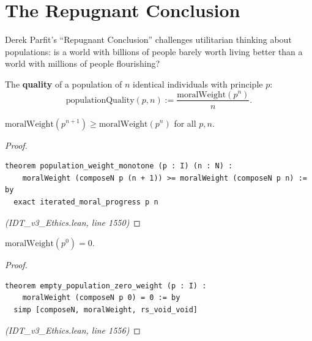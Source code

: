 \section{The Repugnant Conclusion}
\label{sec:repugnant-conclusion}

Derek Parfit's ``Repugnant Conclusion'' challenges utilitarian thinking
about populations: is a world with billions of people barely worth living
better than a world with millions of people flourishing?

\begin{definition}
\label{def:population-quality}
The \textbf{quality} of a population of $n$ identical individuals with
principle $p$:
\[
  \mathrm{populationQuality}(p, n) := \frac{\mathrm{moralWeight}(p^n)}{n}.
\]
\end{definition}

\begin{theorem}
\label{thm:population-monotone}
$\mathrm{moralWeight}(p^{n+1}) \geq \mathrm{moralWeight}(p^n)$ for all $p, n$.
\end{theorem}

\begin{proof}
\begin{lstlisting}
theorem population_weight_monotone (p : I) (n : N) :
    moralWeight (composeN p (n + 1)) >= moralWeight (composeN p n) := by
  exact iterated_moral_progress p n
\end{lstlisting}
\textit{(IDT\_v3\_Ethics.lean, line 1550)}
\end{proof}

\begin{theorem}
\label{thm:empty-population}
$\mathrm{moralWeight}(p^0) = 0$.
\end{theorem}

\begin{proof}
\begin{lstlisting}
theorem empty_population_zero_weight (p : I) :
    moralWeight (composeN p 0) = 0 := by
  simp [composeN, moralWeight, rs_void_void]
\end{lstlisting}
\textit{(IDT\_v3\_Ethics.lean, line 1556)}
\end{proof}


